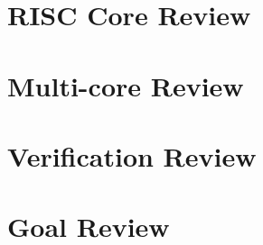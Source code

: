 \documentclass[11pt,a4paper,twoside]{report}
\begin{document}
    \section{RISC Core Review}
    \section{Multi-core Review}
    \section{Verification Review}
    \section{Goal Review}

%
%
%
%
%
\end{document}
